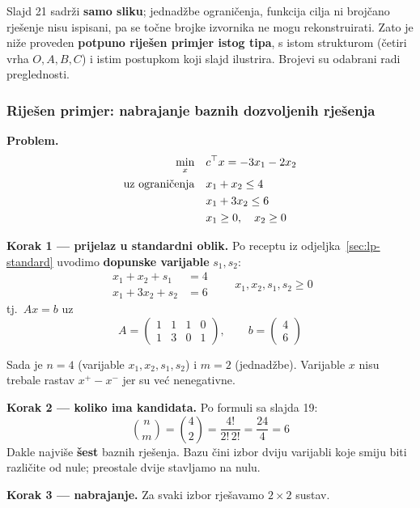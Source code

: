 \begin{napomena}
Slajd 21 sadrži \textbf{samo sliku}; jednadžbe ograničenja, funkcija cilja ni
brojčano rješenje nisu ispisani, pa se točne brojke izvornika ne mogu
rekonstruirati. Zato je niže proveden \textbf{potpuno riješen primjer istog
tipa}, s istom strukturom (četiri vrha $O, A, B, C$) i istim postupkom koji
slajd ilustrira. Brojevi su odabrani radi preglednosti.
\end{napomena}

\subsubsection*{Riješen primjer: nabrajanje baznih dozvoljenih rješenja}

\textbf{Problem.}
\[
\begin{aligned}
\min_x \quad & c\T x = -3x_1 - 2x_2 \\
\uzogr & x_1 + x_2 \le 4 \\
       & x_1 + 3x_2 \le 6 \\
       & x_1 \ge 0, \quad x_2 \ge 0
\end{aligned}
\]

\textbf{Korak 1 --- prijelaz u standardni oblik.} Po receptu iz
odjeljka~\ref{sec:lp-standard} uvodimo \textbf{dopunske varijable} $s_1, s_2$:
\[
\begin{aligned}
x_1 + x_2 + s_1 &= 4 \\
x_1 + 3x_2 + s_2 &= 6
\end{aligned}
\qquad x_1, x_2, s_1, s_2 \ge 0
\]
tj.\ $Ax = b$ uz
\[
A = \begin{pmatrix} 1 & 1 & 1 & 0 \\ 1 & 3 & 0 & 1 \end{pmatrix},
\qquad b = \begin{pmatrix} 4 \\ 6 \end{pmatrix}
\]

Sada je $n = 4$ (varijable $x_1, x_2, s_1, s_2$) i $m = 2$ (jednadžbe).
Varijable $x$ nisu trebale rastav $x^+ - x^-$ jer su već nenegativne.

\textbf{Korak 2 --- koliko ima kandidata.} Po formuli sa slajda 19:
\[
\binom{n}{m} = \binom{4}{2} = \frac{4!}{2!\,2!} = \frac{24}{4} = 6
\]
Dakle najviše \textbf{šest} baznih rješenja. Bazu čini izbor dviju varijabli
koje smiju biti različite od nule; preostale dvije stavljamo na nulu.

\textbf{Korak 3 --- nabrajanje.} Za svaki izbor rješavamo $2\times2$ sustav.

